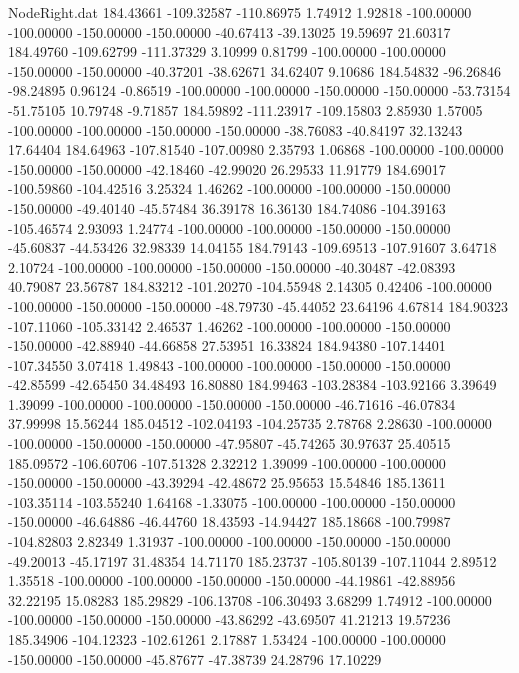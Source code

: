 \begin{filecontents}{NodeRight.dat}
 184.43661 -109.32587 -110.86975     1.74912    1.92818 -100.00000 -100.00000 -150.00000 -150.00000  -40.67413  -39.13025   19.59697   21.60317
 184.49760 -109.62799 -111.37329     3.10999    0.81799 -100.00000 -100.00000 -150.00000 -150.00000  -40.37201  -38.62671   34.62407    9.10686
 184.54832  -96.26846  -98.24895     0.96124   -0.86519 -100.00000 -100.00000 -150.00000 -150.00000  -53.73154  -51.75105   10.79748   -9.71857
 184.59892 -111.23917 -109.15803     2.85930    1.57005 -100.00000 -100.00000 -150.00000 -150.00000  -38.76083  -40.84197   32.13243   17.64404
 184.64963 -107.81540 -107.00980     2.35793    1.06868 -100.00000 -100.00000 -150.00000 -150.00000  -42.18460  -42.99020   26.29533   11.91779
 184.69017 -100.59860 -104.42516     3.25324    1.46262 -100.00000 -100.00000 -150.00000 -150.00000  -49.40140  -45.57484   36.39178   16.36130
 184.74086 -104.39163 -105.46574     2.93093    1.24774 -100.00000 -100.00000 -150.00000 -150.00000  -45.60837  -44.53426   32.98339   14.04155
 184.79143 -109.69513 -107.91607     3.64718    2.10724 -100.00000 -100.00000 -150.00000 -150.00000  -40.30487  -42.08393   40.79087   23.56787
 184.83212 -101.20270 -104.55948     2.14305    0.42406 -100.00000 -100.00000 -150.00000 -150.00000  -48.79730  -45.44052   23.64196    4.67814
 184.90323 -107.11060 -105.33142     2.46537    1.46262 -100.00000 -100.00000 -150.00000 -150.00000  -42.88940  -44.66858   27.53951   16.33824
 184.94380 -107.14401 -107.34550     3.07418    1.49843 -100.00000 -100.00000 -150.00000 -150.00000  -42.85599  -42.65450   34.48493   16.80880
 184.99463 -103.28384 -103.92166     3.39649    1.39099 -100.00000 -100.00000 -150.00000 -150.00000  -46.71616  -46.07834   37.99998   15.56244
 185.04512 -102.04193 -104.25735     2.78768    2.28630 -100.00000 -100.00000 -150.00000 -150.00000  -47.95807  -45.74265   30.97637   25.40515
 185.09572 -106.60706 -107.51328     2.32212    1.39099 -100.00000 -100.00000 -150.00000 -150.00000  -43.39294  -42.48672   25.95653   15.54846
 185.13611 -103.35114 -103.55240     1.64168   -1.33075 -100.00000 -100.00000 -150.00000 -150.00000  -46.64886  -46.44760   18.43593  -14.94427
 185.18668 -100.79987 -104.82803     2.82349    1.31937 -100.00000 -100.00000 -150.00000 -150.00000  -49.20013  -45.17197   31.48354   14.71170
 185.23737 -105.80139 -107.11044     2.89512    1.35518 -100.00000 -100.00000 -150.00000 -150.00000  -44.19861  -42.88956   32.22195   15.08283
 185.29829 -106.13708 -106.30493     3.68299    1.74912 -100.00000 -100.00000 -150.00000 -150.00000  -43.86292  -43.69507   41.21213   19.57236
 185.34906 -104.12323 -102.61261     2.17887    1.53424 -100.00000 -100.00000 -150.00000 -150.00000  -45.87677  -47.38739   24.28796   17.10229

\end{filecontents}
